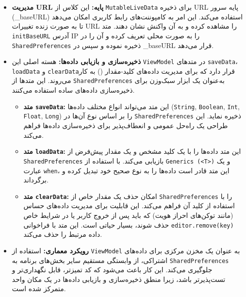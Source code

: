 \documentclass{report}
\begin{document}
\begin{itemize}
	\item \textbf{مدیریت URL پایه:} این کلاس از \texttt{MutableLiveData} برای ذخیره URL پایه سرور (\_baseURL) استفاده می‌کند. این امر به کامپوننت‌های رابط کاربری امکان می‌دهد تا به صورت زنده تغییرات URL را مشاهده کرده و به آن واکنش نشان دهند. متد \texttt{initBaseURL} آدرس IP را به صورت محلی تعریف کرده و آن را در \texttt{SharedPreferences} ذخیره نموده و سپس در \_baseURL قرار می‌دهد.
	
	\item \textbf{ذخیره‌سازی و بازیابی داده‌ها:} هسته اصلی این \texttt{ViewModel} در متدهای \texttt{saveData}، \texttt{loadData} و \texttt{clearData}قرار دارد که برای مدیریت داده‌های کلید-مقدار  () به کار می‌روند. این متدها از \texttt{SharedPreferences} به‌عنوان یک ابزار سبک‌وزن برای ذخیره‌سازی داده‌های ساده استفاده می‌کنند.
	\begin{itemize}
\item \textbf{متد \texttt{saveData}:} این متد می‌تواند انواع مختلف داده‌ها (\texttt{String}, \texttt{Boolean}, \texttt{Int}, \texttt{Float}, \texttt{Long}) را بر اساس نوع آن‌ها در \texttt{SharedPreferences} ذخیره نماید. این طراحی یک راه‌حل عمومی و انعطاف‌پذیر برای ذخیره‌سازی داده‌ها فراهم می‌کند.

\item \textbf{متد \texttt{loadData}:} این متد داده‌ها را با یک کلید مشخص و یک مقدار پیش‌فرض از \texttt{SharedPreferences} بازیابی می‌کند. با استفاده از \texttt{Generics (<T>)} و یک عبارت \texttt{when}، این متد قادر است داده‌ها را به نوع صحیح خود تبدیل کرده و برگرداند.


\item \textbf{متد \texttt{clearData}:} امکان حذف یک مقدار خاص از \texttt{SharedPreferences} را با استفاده از کلید آن فراهم می‌کند. 
این قابلیت برای مدیریت داده‌های حساس (مانند توکن‌های احراز هویت) که باید پس از خروج کاربر یا در شرایط خاص حذف شوند، بسیار حیاتی است. 
این متد با فراخوانی \texttt{editor.remove(key)} داده مرتبط را حذف می‌کند.

	\end{itemize} 	
	\item \textbf{رویکرد معماری:} استفاده از \texttt{ViewModel} به عنوان یک مخزن مرکزی برای داده‌های اشتراکی، از وابستگی مستقیم سایر بخش‌های برنامه به \texttt{SharedPreferences} جلوگیری می‌کند. این کار باعث می‌شود که کد تمیزتر، قابل نگهداری‌تر و تست‌پذیرتر باشد، زیرا منطق ذخیره‌سازی و بازیابی داده‌ها در یک مکان واحد متمرکز شده است.
\end{itemize}
\end{document}
